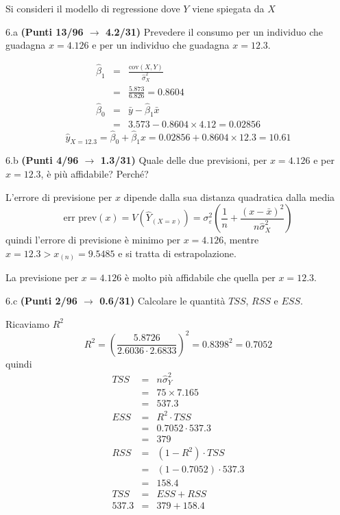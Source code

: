 \documentclass[
  11pt,
]{book}
\theoremstyle{mytheoremstyle}
\theoremstyle{mydefstyle}
\newenvironment{sol}
  {
  \begin{tcolorbox}[enhanced,breakable,arc=0.1mm,boxrule=1pt,colback=white,colframe=iblue,
  title=\bf \fontfamily{lmss}\selectfont \hspace{.5 cm} Soluzione,drop fuzzy shadow]

}{
\end{tcolorbox}
  }
\begin{document}
Si consideri il modello di regressione dove \(Y\) viene spiegata da \(X\)

6.a \textbf{(Punti 13/96 \(\rightarrow\) 4.2/31)} Prevedere il consumo per un individuo che guadagna \(x=4.126\) e
per un individuo che guadagna \(x=12.3\).

\begin{sol}
\begin{eqnarray*}
       \hat\beta_1 &=& \frac{\text{cov}(X,Y)}{\hat\sigma_X^2} \\
            &=& \frac{ 5.873 }{ 6.826 }  =  0.8604 \\
      \hat\beta_0 &=& \bar y - \hat\beta_1 \bar x\\
          &=&  3.573 - 0.8604 \times  4.12 = 0.02856 
      \end{eqnarray*}\[\hat y_{X= 12.3 }=\hat\beta_0+\hat\beta_1 x= 0.02856 + 0.8604 \times 12.3 = 10.61 \]

\end{sol}

6.b \textbf{(Punti 4/96 \(\rightarrow\) 1.3/31)} Quale delle due previsioni, per \(x=4.126\) e per \(x=12.3\),
è più affidabile? Perché?

\begin{sol}
L'errore di previsione per \(x\) dipende dalla sua distanza quadratica dalla media
\[
\text{err prev}(x)=V(\hat Y_{(X=x)})=\sigma_{\varepsilon}^{2}\left(\frac 1n+\frac{(x-\bar x)^2} {n \hat{\sigma}^{2}_{X}} \right)
\]
quindi l'errore di previsione è minimo per \(x=4.126\), mentre \(x=12.3>x_{(n)}=9.5485\)
e si tratta di estrapolazione.

La previsione per \(x=4.126\) è molto più affidabile che quella per \(x=12.3\).

\end{sol}

6.c \textbf{(Punti 2/96 \(\rightarrow\) 0.6/31)} Calcolare le quantità \(TSS\), \(RSS\) e \(ESS\).

\begin{sol}
Ricaviamo \(R^2\)
\[R^2=\left(\frac{5.8726}{2.6036\cdot 2.6833}\right)^2=0.8398^2=0.7052\]
quindi
\begin{eqnarray*}
   TSS &=& n\hat\sigma^2_Y\\
      &=& 75 \times 7.165 \\
      &=&  537.3 \\
   ESS &=& R^2\cdot TSS\\
      &=&  0.7052 \cdot 537.3 \\
      &=& 379 \\
   RSS &=& (1-R^2)\cdot TSS\\
      &=& (1- 0.7052 )\cdot 537.3 \\
      &=&  158.4 \\
   TSS &=& ESS+RSS \\ 537.3  &=&  379 + 158.4 
  \end{eqnarray*}

\end{sol}
\end{document}
